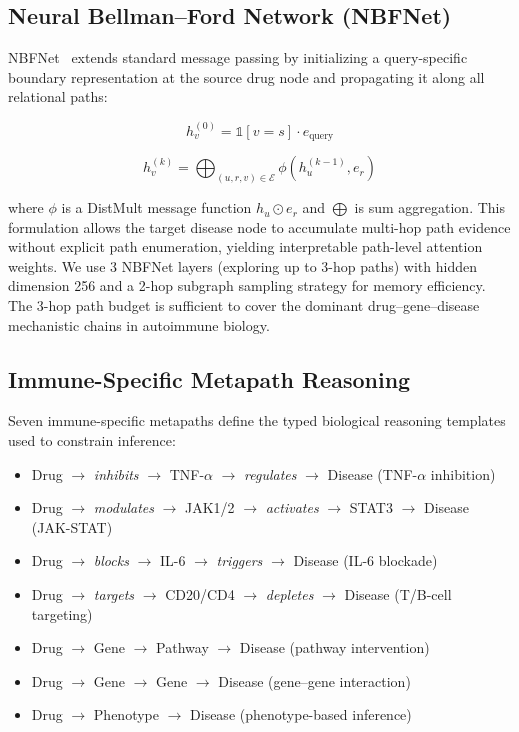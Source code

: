 \documentclass[conference]{IEEEtran}
\begin{document}
\subsection{Neural Bellman--Ford Network (NBFNet)}

NBFNet~\cite{nbfnet} extends standard message passing by initializing a query-specific boundary representation at the source drug node and propagating it along all relational paths:

\begin{equation}
h_v^{(0)} = \mathbb{1}[v = s] \cdot e_{\text{query}}
\end{equation}

\begin{equation}
h_v^{(k)} = \bigoplus_{(u,r,v) \in \mathcal{E}} \phi\!\left(h_u^{(k-1)}, e_r\right)
\end{equation}

where $\phi$ is a DistMult message function $h_u \odot e_r$ and $\bigoplus$ is sum aggregation. This formulation allows the target disease node to accumulate multi-hop path evidence without explicit path enumeration, yielding interpretable path-level attention weights. We use 3 NBFNet layers (exploring up to 3-hop paths) with hidden dimension 256 and a 2-hop subgraph sampling strategy for memory efficiency. The 3-hop path budget is sufficient to cover the dominant drug--gene--disease mechanistic chains in autoimmune biology.

\subsection{Immune-Specific Metapath Reasoning}

Seven immune-specific metapaths define the typed biological reasoning templates used to constrain inference:
\begin{itemize}
    \item Drug $\to$ \textit{inhibits} $\to$ TNF-$\alpha$ $\to$ \textit{regulates} $\to$ Disease (TNF-$\alpha$ inhibition)
    \item Drug $\to$ \textit{modulates} $\to$ JAK1/2 $\to$ \textit{activates} $\to$ STAT3 $\to$ Disease (JAK-STAT)
    \item Drug $\to$ \textit{blocks} $\to$ IL-6 $\to$ \textit{triggers} $\to$ Disease (IL-6 blockade)
    \item Drug $\to$ \textit{targets} $\to$ CD20/CD4 $\to$ \textit{depletes} $\to$ Disease (T/B-cell targeting)
    \item Drug $\to$ Gene $\to$ Pathway $\to$ Disease (pathway intervention)
    \item Drug $\to$ Gene $\to$ Gene $\to$ Disease (gene--gene interaction)
    \item Drug $\to$ Phenotype $\to$ Disease (phenotype-based inference)
\end{itemize}
\end{document}
